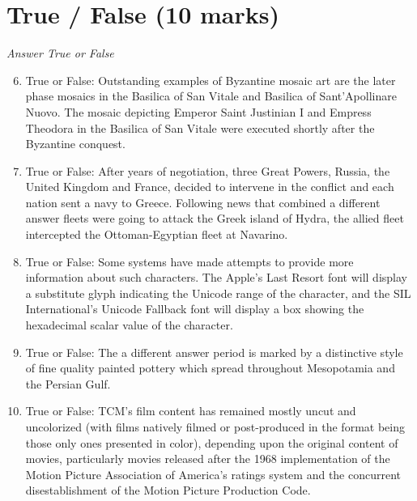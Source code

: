 \documentclass[12pt]{article}
\begin{document}
\section*{True / False (10 marks)}
\textit{Answer True or False}
\begin{enumerate}[label=\arabic*.]
\setcounter{enumi}{5}
\item True or False: Outstanding examples of Byzantine mosaic art are the later phase mosaics in the Basilica of San Vitale and Basilica of Sant'Apollinare Nuovo. The mosaic depicting Emperor Saint Justinian I and Empress Theodora in the Basilica of San Vitale were executed shortly after the Byzantine conquest.
\item True or False: After years of negotiation, three Great Powers, Russia, the United Kingdom and France, decided to intervene in the conflict and each nation sent a navy to Greece. Following news that combined a different answer fleets were going to attack the Greek island of Hydra, the allied fleet intercepted the Ottoman-Egyptian fleet at Navarino.
\item True or False: Some systems have made attempts to provide more information about such characters. The Apple's Last Resort font will display a substitute glyph indicating the Unicode range of the character, and the SIL International's Unicode Fallback font will display a box showing the hexadecimal scalar value of the character.
\item True or False: The a different answer period is marked by a distinctive style of fine quality painted pottery which spread throughout Mesopotamia and the Persian Gulf.
\item True or False: TCM's film content has remained mostly uncut and uncolorized (with films natively filmed or post-produced in the format being those only ones presented in color), depending upon the original content of movies, particularly movies released after the 1968 implementation of the Motion Picture Association of America's ratings system and the concurrent disestablishment of the Motion Picture Production Code.
\end{enumerate}
\end{document}

